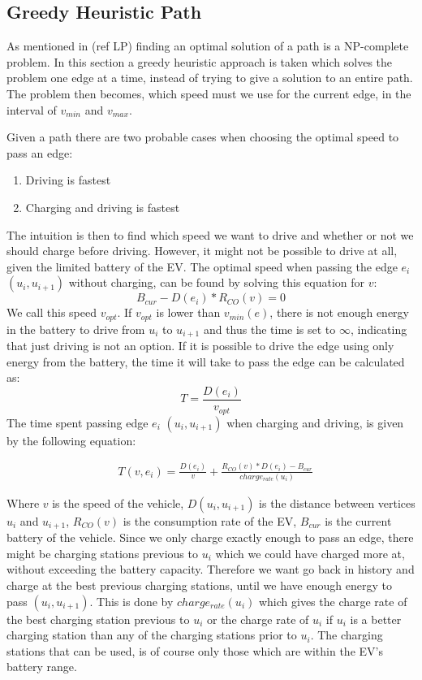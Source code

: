 \subsection{Greedy Heuristic Path}\label{sec:greedy}
As mentioned in (ref LP) finding an optimal solution of a path is a NP-complete problem. In this section a greedy heuristic approach is taken which solves the problem one edge at a time, instead of trying to give a solution to an entire path. The problem then becomes, which speed must we use for the current edge, in the interval of $v_{min}$ and $v_{max}$.

Given a path there are two probable cases when choosing the optimal speed to pass an edge:
\begin{enumerate}
	\item Driving is fastest
	\item Charging and driving is fastest
\end{enumerate}

The intuition is then to find which speed we want to drive and whether or not we should charge before driving. However, it might not be possible to drive at all, given the limited battery of the EV. The optimal speed when passing the edge $e_i$ $(u_i, u_{i+1})$ without charging, can be found by solving this equation for $v$:
\[B_{cur} - D(e_i) * R_{CO}(v) = 0\] 
We call this speed $v_{opt}$. If $v_{opt}$ is lower than $v_{min}(e)$, there is not enough energy in the battery to drive from $u_i$ to $u_{i+1}$ and thus the time is set to $\infty$, indicating that just driving is not an option. If it is possible to drive the edge using only energy from the battery, the time it will take to pass the edge can be calculated as:
 \[T = \frac{D(e_i)}{v_{opt}} \] 
The time spent passing edge $e_i$ $(u_i, u_{i+1})$ when charging and driving, is given by the following equation:

\begin{equation*}
\begin{aligned}
 & T(v,e_i) = \frac{D(e_i)}{v} + \frac{R_{CO}(v) * D(e_i) - B_{cur}}{charge_{rate}(u_{i})}
\end{aligned}
\end{equation*}\label{eq:drivingAndCharging}

Where $v$ is the speed of the vehicle, $D(u_i, u_{i+1})$ is the distance between vertices $u_i$ and $u_{i+1}$, $R_{CO}(v)$ is the consumption rate of the EV, $B_{cur}$ is the current battery of the vehicle. Since we only charge exactly enough to pass an edge, there might be charging stations previous to $u_i$ which we could have charged more at, without exceeding the battery capacity. Therefore we want go back in history and charge at the best previous charging stations, until we have enough energy to pass $(u_i, u_{i+1})$. This is done by $charge_{rate}(u_i)$ which gives the charge rate of the best charging station previous to $u_{i}$ or the charge rate of $u_i$ if $u_i$ is a better charging station than any of the charging stations prior to $u_i$. The charging stations that can be used, is of course only those which are within the EV's battery range.


